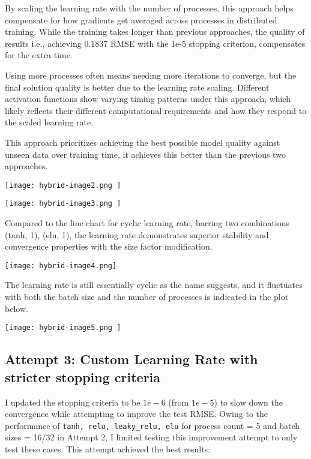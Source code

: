 \documentclass{article}
\begin{document}
By scaling the learning rate with the number of processes, this approach helps compensate for how gradients get averaged across processes in distributed training. While the training takes longer than previous approaches, the quality of results i.e., achieving 0.1837 RMSE with the 1e-5 stopping criterion, compensates for the extra time.

Using more processes often means needing more iterations to converge, but the final solution quality is better due to the learning rate scaling. Different activation functions show varying timing patterns under this approach, which likely reflects their different computational requirements and how they respond to the scaled learning rate.

This approach prioritizes achieving the best possible model quality against unseen data over training time, it achieves this better than the previous two approaches.

\begin{center}
\texttt{[image: hybrid-image2.png ]}
\end{center}

\begin{center}
\texttt{[image: hybrid-image3.png ]}
\end{center}

Compared to the line chart for cyclic learning rate, barring two combinations {(tanh, 1), (elu, 1)}, the learning rate demonstrates superior stability and convergence properties with the size factor modification.

\begin{center}
\texttt{[image: hybrid-image4.png]}
\end{center}

The learning rate is still essentially cyclic as the name suggests, and it fluctuates with both the batch size and the number of processes is indicated in the plot below.

\begin{center}
\texttt{[image: hybrid-image5.png ]}
\end{center}

\subsection{Attempt 3: Custom Learning Rate with stricter stopping criteria}

I updated the stopping criteria to be $1e-6$ (from $1e-5$) to slow down the convergence while attempting to improve the test RMSE. Owing to the performance of \verb|tanh, relu, leaky_relu, elu| for process count = 5 and batch sizes = 16/32 in Attempt 2, I limited testing this improvement attempt to only test these cases. This attempt achieved the best results:
\end{document}
